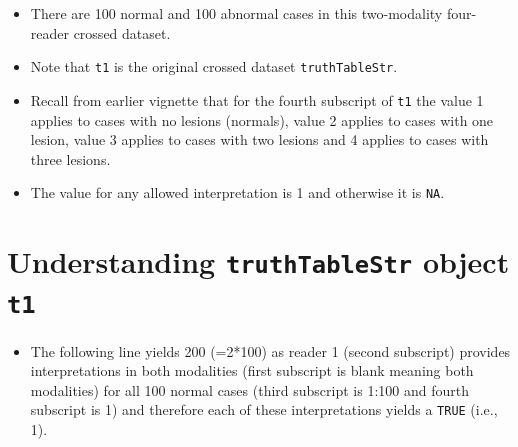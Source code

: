 \documentclass[]{book}
\newenvironment{Shaded}{\begin{snugshade}}{\end{snugshade}}
\newcommand{\CommentTok}[1]{\textcolor[rgb]{0.56,0.35,0.01}{\textit{#1}}}
\newcommand{\DataTypeTok}[1]{\textcolor[rgb]{0.13,0.29,0.53}{#1}}
\newcommand{\KeywordTok}[1]{\textcolor[rgb]{0.13,0.29,0.53}{\textbf{#1}}}
\newcommand{\NormalTok}[1]{#1}
\newcommand{\OperatorTok}[1]{\textcolor[rgb]{0.81,0.36,0.00}{\textbf{#1}}}
\newcommand{\OtherTok}[1]{\textcolor[rgb]{0.56,0.35,0.01}{#1}}
\newcommand{\StringTok}[1]{\textcolor[rgb]{0.31,0.60,0.02}{#1}}
\providecommand{\tightlist}{%
  \setlength{\itemsep}{0pt}\setlength{\parskip}{0pt}}
\begin{document}
\begin{Shaded}
\end{Shaded}

\begin{itemize}
\tightlist
\item
  There are 100 normal and 100 abnormal cases in this two-modality four-reader crossed dataset.
\item
  Note that \texttt{t1} is the original crossed dataset \texttt{truthTableStr}.
\item
  Recall from earlier vignette that for the fourth subscript of \texttt{t1} the value 1 applies to cases with no lesions (normals), value 2 applies to cases with one lesion, value 3 applies to cases with two lesions and 4 applies to cases with three lesions.
\item
  The value for any allowed interpretation is 1 and otherwise it is \texttt{NA}.
\end{itemize}

\hypertarget{understanding-truthtablestr-object-t1}{%
\section{\texorpdfstring{Understanding \texttt{truthTableStr} object \texttt{t1}}{Understanding truthTableStr object t1}}\label{understanding-truthtablestr-object-t1}}

\begin{itemize}
\tightlist
\item
  The following line yields 200 (=2*100) as reader 1 (second subscript) provides interpretations in both modalities (first subscript is blank meaning both modalities) for all 100 normal cases (third subscript is 1:100 and fourth subscript is 1) and therefore each of these interpretations yields a \texttt{TRUE} (i.e., 1).
\end{itemize}
\end{document}
